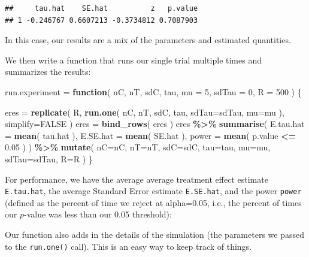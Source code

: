 \documentclass[
]{book}
\newenvironment{Shaded}{\begin{snugshade}}{\end{snugshade}}
\newcommand{\AttributeTok}[1]{\textcolor[rgb]{0.13,0.29,0.53}{#1}}
\newcommand{\ConstantTok}[1]{\textcolor[rgb]{0.56,0.35,0.01}{#1}}
\newcommand{\ControlFlowTok}[1]{\textcolor[rgb]{0.13,0.29,0.53}{\textbf{#1}}}
\newcommand{\DecValTok}[1]{\textcolor[rgb]{0.00,0.00,0.81}{#1}}
\newcommand{\FloatTok}[1]{\textcolor[rgb]{0.00,0.00,0.81}{#1}}
\newcommand{\FunctionTok}[1]{\textcolor[rgb]{0.13,0.29,0.53}{\textbf{#1}}}
\newcommand{\NormalTok}[1]{#1}
\newcommand{\OtherTok}[1]{\textcolor[rgb]{0.56,0.35,0.01}{#1}}
\newcommand{\SpecialCharTok}[1]{\textcolor[rgb]{0.81,0.36,0.00}{\textbf{#1}}}
\begin{document}
\begin{verbatim}
##     tau.hat    SE.hat          z   p.value
## 1 -0.246767 0.6607213 -0.3734812 0.7087903
\end{verbatim}

In this case, our results are a mix of the parameters and estimated quantities.

We then write a function that runs our single trial multiple times and
summarizes the results:

\begin{Shaded}
\begin{Highlighting}[]
\NormalTok{run.experiment }\OtherTok{=} \ControlFlowTok{function}\NormalTok{( nC, nT, sdC, tau, }\AttributeTok{mu =} \DecValTok{5}\NormalTok{, }\AttributeTok{sdTau =} \DecValTok{0}\NormalTok{, }\AttributeTok{R =} \DecValTok{500}\NormalTok{ ) \{}

\NormalTok{  eres }\OtherTok{=} \FunctionTok{replicate}\NormalTok{( R, }\FunctionTok{run.one}\NormalTok{( nC, nT, sdC, tau, }\AttributeTok{sdTau=}\NormalTok{sdTau, }\AttributeTok{mu=}\NormalTok{mu ), }
                    \AttributeTok{simplify=}\ConstantTok{FALSE}\NormalTok{ )}
\NormalTok{  eres }\OtherTok{=} \FunctionTok{bind\_rows}\NormalTok{( eres )}
\NormalTok{  eres }\SpecialCharTok{\%\textgreater{}\%} \FunctionTok{summarise}\NormalTok{( }\AttributeTok{E.tau.hat =} \FunctionTok{mean}\NormalTok{( tau.hat ),}
                      \AttributeTok{E.SE.hat =} \FunctionTok{mean}\NormalTok{( SE.hat ),}
                      \AttributeTok{power =} \FunctionTok{mean}\NormalTok{( p.value }\SpecialCharTok{\textless{}=} \FloatTok{0.05}\NormalTok{ ) ) }\SpecialCharTok{\%\textgreater{}\%}
    \FunctionTok{mutate}\NormalTok{( }\AttributeTok{nC=}\NormalTok{nC, }\AttributeTok{nT=}\NormalTok{nT, }\AttributeTok{sdC=}\NormalTok{sdC, }\AttributeTok{tau=}\NormalTok{tau, }\AttributeTok{mu=}\NormalTok{mu, }\AttributeTok{sdTau=}\NormalTok{sdTau, }\AttributeTok{R=}\NormalTok{R )}
\NormalTok{\}}
\end{Highlighting}
\end{Shaded}

For performance, we have the average average treatment effect estimate \texttt{E.tau.hat},
the average Standard Error estimate \texttt{E.SE.hat},
and the power \texttt{power} (defined as the percent of time we reject at
alpha=0.05, i.e., the percent of times our \(p\)-value was less than our 0.05
threshold):

Our function also adds in the details of the simulation (the parameters we passed
to the \texttt{run.one()} call). This is an easy way to keep track of things.
\end{document}
